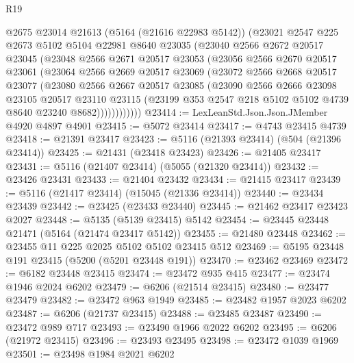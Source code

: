 \begin{lexlean}{R19}
\begin{coremodule}
{{{{{{{{{{{          @2675
          @23014
          @21613
          (@5164 (@21616 @22983 @5142))
          (@23021
            @2547
            @225
            @2673
            @5102
            @5104
            @22981
            @8640
            @23035
            (@23040
              @2566
              @2672
              @20517
              @23045
              (@23048
                @2566
                @2671
                @20517
                @23053
                (@23056
                  @2566
                  @2670
                  @20517
                  @23061
                  (@23064
                    @2566
                    @2669
                    @20517
                    @23069
                    (@23072
                      @2566
                      @2668
                      @20517
                      @23077
                      (@23080
                        @2566
                        @2667
                        @20517
                        @23085
                        (@23090
                          @2566
                          @2666
                          @23098
                          @23105
                          @20517
                          @23110
                          @23115
                          (@23199 @353 @2547 @218 @5102 @5102 @4739 @8640 @23240 @8682))))))))))))
@23414 := LexLeanStd.Json.Json.JMember @4920 @4897 @4901
@23415 := @5072 @23414
@23417 := @4743 @23415 @4739
@23418 := @21391 @23417
@23423 := @5116 (@21393 @23414) (@504 (@21396 @23414))
@23425 := @21431 (@23418 @23423)
@23426 := @21405 @23417
@23431 := @5116 (@21407 @23414) (@5055 (@21320 @23414))
@23432 := @23426 @23431
@23433 := @21404 @23432
@23434 := @21415 @23417
@23439 := @5116 (@21417 @23414) (@15045 (@21336 @23414))
@23440 := @23434 @23439
@23442 := @23425 (@23433 @23440)
@23445 := @21462 @23417 @23423 @2027
@23448 := @5135 (@5139 @23415) @5142
@23454 := @23445 @23448 @21471 (@5164 (@21474 @23417 @5142))
@23455 := @21480 @23448
@23462 := @23455 @11 @225 @2025 @5102 @5102 @23415 @512
@23469 := @5195 @23448 @191 @23415 (@5200 (@5201 @23448 @191))
@23470 := @23462 @23469
@23472 := @6182 @23448 @23415
@23474 := @23472 @935 @415
@23477 := @23474 @1946 @2024 @6202
@23479 := @6206 (@21514 @23415)
@23480 := @23477 @23479
@23482 := @23472 @963 @1949
@23485 := @23482 @1957 @2023 @6202
@23487 := @6206 (@21737 @23415)
@23488 := @23485 @23487
@23490 := @23472 @989 @717
@23493 := @23490 @1966 @2022 @6202
@23495 := @6206 (@21972 @23415)
@23496 := @23493 @23495
@23498 := @23472 @1039 @1969
@23501 := @23498 @1984 @2021 @6202
}}}}}}}}}}}
\end{coremodule}
\end{lexlean}
